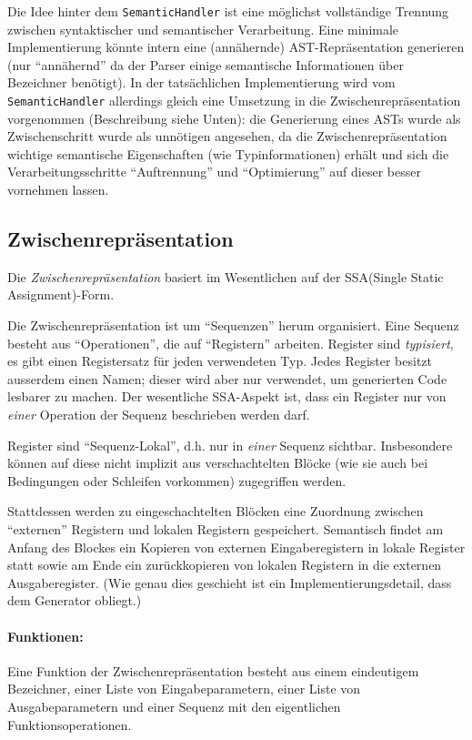 \documentclass[twoside,a4paper,fleqn,12pt]{article}
\begin{document}
Die Idee hinter dem \verb+SemanticHandler+ ist eine möglichst vollständige Trennung zwischen syntaktischer
und semantischer Verarbeitung. Eine minimale Implementierung könnte intern eine (annähernde)
AST-Repräsentation generieren (nur "`annähernd"' da der Parser einige semantische Informationen über
Bezeichner benötigt). In der tatsächlichen Implementierung wird vom \verb+SemanticHandler+ allerdings 
gleich eine Umsetzung in die Zwischenrepräsentation vorgenommen (Beschreibung siehe Unten):
die Generierung eines ASTs wurde als Zwischenschritt wurde als unnötigen angesehen, da die Zwischenrepräsentation
wichtige semantische Eigenschaften (wie Typinformationen) erhält und sich die Verarbeitungsschritte "`Auftrennung"'
und "`Optimierung"' auf dieser besser vornehmen lassen.

\subsection{Zwischenrepräsentation}


Die \emph{Zwischenrepräsentation} basiert im Wesentlichen auf der SSA(Single Static Assignment)-Form.

Die Zwischenrepräsentation ist um "`Sequenzen"' herum organisiert. Eine Sequenz besteht aus "`Operationen"',
die auf "`Registern"' arbeiten. Register sind \emph{typisiert}, es gibt einen Registersatz für jeden verwendeten Typ.
Jedes Register besitzt ausserdem einen Namen; dieser wird aber nur verwendet, um generierten Code lesbarer zu machen.
Der wesentliche SSA-Aspekt ist, dass ein Register nur von \emph{einer} Operation der Sequenz beschrieben werden darf.

Register sind "`Sequenz-Lokal"', d.h. nur in \emph{einer} Sequenz sichtbar. Insbesondere können auf diese nicht implizit
aus verschachtelten Blöcke (wie sie auch bei Bedingungen oder Schleifen vorkommen) zugegriffen werden. 

Stattdessen werden zu eingeschachtelten Blöcken eine Zuordnung zwischen "`externen"' Registern und
lokalen Registern gespeichert. Semantisch findet am Anfang des Blockes ein Kopieren von externen Eingaberegistern
in lokale Register statt sowie am Ende ein zurückkopieren von lokalen Registern in die externen Ausgaberegister.
(Wie genau dies geschieht ist ein Implementierungsdetail, dass dem Generator obliegt.)

\paragraph{Funktionen:}
Eine Funktion der Zwischenrepräsentation besteht aus einem eindeutigem Bezeichner, einer Liste von Eingabeparametern,
einer Liste von Ausgabeparametern und einer Sequenz mit den eigentlichen Funktionsoperationen.
\end{document}
